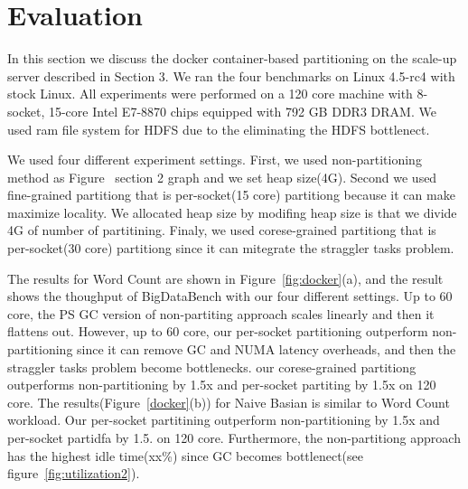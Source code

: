 \section{Evaluation}

\ifkor
In this section we discuss the docker container-based partitioning on the
scale-up server described in Section 3.
We ran the four benchmarks on Linux 4.5-rc4 with stock Linux. 
All experiments were performed on a 120 core machine with 8-socket, 15-core
Intel E7-8870 chips equipped with 792 GB DDR3 DRAM.
We used ram file system for HDFS due to the eliminating the HDFS bottlenect.
\else

\fi




\ifkor
We used four different experiment settings.
First, we used non-partitioning method as Figure~ section 2 graph and we set
heap size(4G).
Second we used fine-grained partitiong that is per-socket(15 core) partitiong
because it can make maximize locality.
We allocated heap size by modifing heap size is that we divide 4G of number of
partitining.
Finaly, we used corese-grained partitiong that is per-socket(30 core) partitiong
since it can mitegrate the straggler tasks problem.
\else

\fi


\ifkor
The results for Word Count are shown in Figure~\ref{fig:docker}(a), and the
result shows the thoughput of BigDataBench with our four different settings.
Up to 60 core, the PS GC version of non-partiting approach scales linearly and
then it flattens out.
However, up to 60 core, our per-socket partitioning outperform non-partitioning
since it can remove GC and NUMA latency overheads, and then the straggler tasks
problem become bottlenecks.
our corese-grained partitiong outperforms non-partitioning by 1.5x and
per-socket partiting by 1.5x on 120 core.
The results(Figure~\ref{docker}(b)) for Naive Basian is similar to Word Count
workload.
Our per-socket partitining outperform non-partitioning by 1.5x and per-socket
partidfa by 1.5. on 120 core.
Furthermore, the non-partitiong approach has the highest idle time(xx\%) since
GC becomes bottlenect(see figure~\ref{fig:utilization2}). 
\else 

